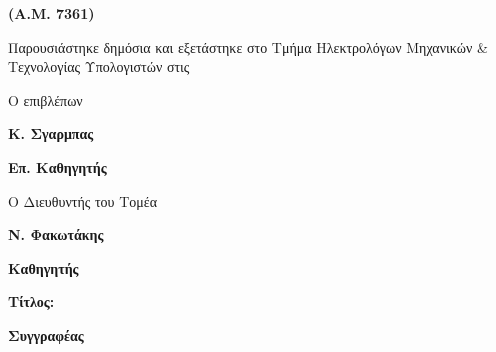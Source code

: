 {\begin {center}
  \vspace{\vs}
  \large\textbf{\theauthor}

  \large\textbf{(A.M. 7361)}

  \vspace{\vs}

{Παρουσιάστηκε δημόσια και εξετάστηκε στο Τμήμα
  Ηλεκτρολόγων Μηχανικών & Τεχνολογίας Υπολογιστών στις}

  \vspace{\vs}
  \vspace{\vs}
  \begin{minipage}{0.45\textwidth}
        \begin{center}
                Ο επιβλέπων

                \vspace{\vs}
                \textbf{Κ. Σγαρμπας}

                \textbf{Επ. Καθηγητής}
        \end{center}
  \end{minipage}%
  \begin{minipage}{0.45\textwidth}
        \begin{center}
                Ο Διευθυντής του Τομέα

                \vspace{\vs}
                \textbf{Ν. Φακωτάκης}

                \textbf{Καθηγητής}
        \end{center}
  \end{minipage}%

  \end {center}

  \clearpage

\large\textbf{Τίτλος:}

\thetitle

    \begin{minipage}{.8\textwidth}
    \large\textbf{Συγγραφέας}

    \theauthor


\end{minipage}}
